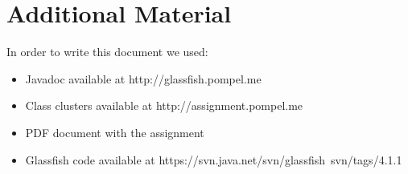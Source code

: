 \section{Additional Material}
In order to write this document we used:
\begin{itemize}
  \item Javadoc available at http://glassfish.pompel.me
  \item Class clusters available at http://assignment.pompel.me 
  \item PDF document with the assignment
  \item Glassfish code available at https://svn.java.net/svn/glassfish~svn/tags/4.1.1
\end{itemize}
